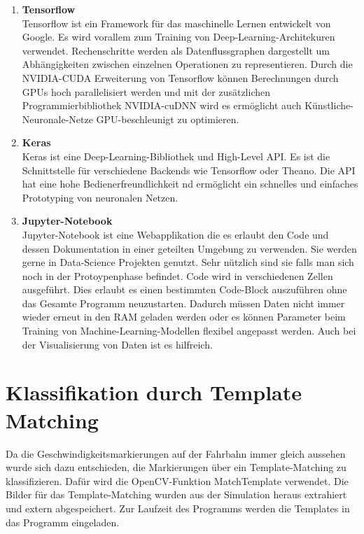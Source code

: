 \begin{enumerate}
\item[] \textbf{Tensorflow}\hfill \\
Tensorflow ist ein Framework f{\"u}r das maschinelle Lernen entwickelt von Google.
Es wird vorallem zum Training von Deep-Learning-Architekuren verwendet.
Rechenschritte werden als Datenflussgraphen dargestellt um Abh{\"a}ngigkeiten zwischen einzelnen Operationen zu representieren.
Durch die NVIDIA-CUDA Erweiterung von Tensorflow k{\"o}nnen Berechnungen durch GPUs hoch parallelisiert werden und mit der zus{\"a}tzlichen Programmierbibliothek NVIDIA-cuDNN wird es
erm{\"o}glicht auch K{\"u}nstliche-Neuronale-Netze GPU-beschleunigt zu optimieren.

\item[] \textbf{Keras}\hfill \\
Keras ist eine Deep-Learning-Bibliothek und High-Level API. Es ist die Schnittstelle f{\"u}r verschiedene Backends wie Tensorflow oder Theano. Die API hat eine hohe Bedienerfreundlichkeit nd erm{\"o}glicht ein schnelles und einfaches Prototyping von neuronalen Netzen.

\item[] \textbf{Jupyter-Notebook}\hfill \\
Jupyter-Notebook ist eine Webapplikation die es erlaubt den Code und dessen Dokumentation in einer geteilten Umgebung zu verwenden. Sie werden gerne in Data-Science Projekten genutzt. Sehr n{\"u}tzlich sind sie falls man sich noch in der Protoypenphase befindet. Code wird in verschiedenen Zellen ausgef{\"u}hrt. Dies erlaubt es einen bestimmten Code-Block auszuf{\"u}hren ohne das Gesamte Programm neuzustarten.  Dadurch m{\"u}ssen Daten nicht immer wieder erneut in den RAM geladen werden oder es k{\"o}nnen Parameter beim Training von Machine-Learning-Modellen flexibel angepasst werden. Auch bei der Visualisierung von Daten ist es hilfreich.



\end{enumerate}

\newpage

\section{Klassifikation durch Template Matching}
\label{sec:Klassifikation durch Template Matching}

Da die Geschwindigkeitsmarkierungen auf der Fahrbahn immer gleich aussehen wurde sich dazu entschieden, die Markierungen {\"u}ber ein Template-Matching zu klassifizieren.
Daf{\"u}r wird die OpenCV-Funktion MatchTemplate verwendet.
Die Bilder f{\"u}r das Template-Matching wurden aus der Simulation heraus extrahiert und extern abgespeichert. Zur Laufzeit des Programms werden die Templates in das Programm eingeladen.

